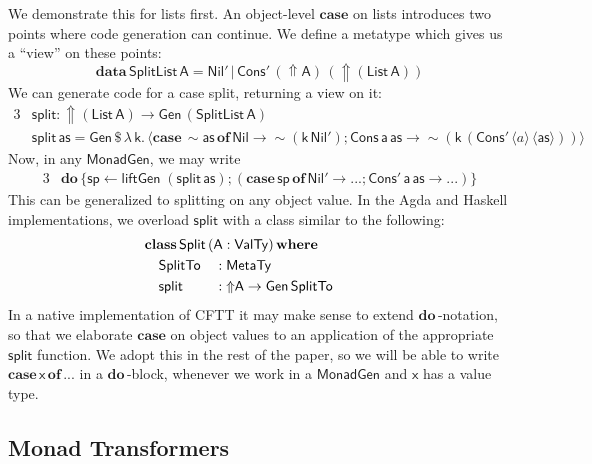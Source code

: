 \documentclass[acmsmall,screen,review,anonymous]{acmart}
\newcommand{\mit}[1]{{\mathsf{#1}}}
\newcommand{\msf}[1]{{\mathsf{#1}}}
\newcommand{\mbf}[1]{{\mathbf{#1}}}
\newcommand{\bs}[1]{\boldsymbol{#1}}
\newcommand{\mdo}{\mbf{do}\,}
\newcommand{\ind}{\hspace{1em}}
\newcommand{\lam}{\lambda\,}
\newcommand{\data}{\mbf{data}\,}
\newcommand{\where}{\mbf{where}}
\newcommand{\of}{\mbf{of}\,}
\newcommand{\vas}{\mathsf{as}}
\newcommand{\vk}{\mathsf{k}}
\newcommand{\vA}{\mathsf{A}}
\newcommand{\va}{\mathsf{a}}
\newcommand{\vx}{\mathsf{x}}
\newcommand{\List}{\msf{List}}
\newcommand{\Nil}{\msf{Nil}}
\newcommand{\Cons}{\msf{Cons}}
\newcommand{\fro}{\leftarrow}
\newcommand{\case}{\mbf{case\,}}
\newcommand{\Lift}{{\Uparrow}}
\newcommand{\Up}{{\Uparrow}}
\newcommand{\spl}{{\bs{\sim}}}
\newcommand{\ql}{{\bs{\langle}}}
\newcommand{\qr}{{\bs{\rangle}}}
\newcommand{\MTy}{\msf{MetaTy}}
\newcommand{\VTy}{\msf{ValTy}}
\theoremstyle{remark}
\newcommand{\tyclass}{\mbf{class}}
\newcommand{\Gen}{\msf{Gen}}
\newcommand{\qt}[1]{\ql#1\qr}
\newcommand{\liftGen}{\mit{liftGen}}
\newcommand{\MonadGen}{\msf{MonadGen}}
\newcommand{\dlr}{\,\$\,}
\begin{document}
We demonstrate this for lists first. An object-level $\mbf{case}$ on lists introduces
two points where code generation can continue. We define a metatype which gives
us a ``view'' on these points:
\[ \data \msf{SplitList}\,\vA = \Nil'\,|\,\Cons'\,(\Up \vA)\,(\Up (\List\,\vA)) \]
We can generate code for a case split, returning a view on it:
\begin{alignat*}{3}
  &\mit{split} : \Up (\List\,\vA) \to \Gen\,(\msf{SplitList}\,\vA)\\
  &\mit{split}\,\vas = \Gen \dlr \lam \vk.\,\qt{\case \spl \vas\,\of \Nil \to \spl(\vk\,\Nil'); \Cons\,\va\,\vas \to \spl(\vk\,(\Cons'\,\qt{a}\,\qt{\vas}))}
\end{alignat*}
Now, in any $\MonadGen$, we may write
\begin{alignat*}{3}
  &\mdo \{\mit{sp} \fro \liftGen\;(\!\mit{split}\,\vas);(\case \mit{sp}\,\of \Nil' \to ...;\Cons'\,\va\,\vas \to ...)\}
\end{alignat*}
This can be generalized to splitting on any object value. In the Agda and
Haskell implementations, we overload $\mit{split}$ with a class similar to the
following:
\begin{alignat*}{3}
  & \hspace{-2em}\mathrlap{\tyclass\,\mit{Split}\,(\vA : \VTy)\,\where}\\
  & \hspace{-2em}\ind \mit{SplitTo} &&: \MTy \\
  & \hspace{-2em}\ind \mit{split}   &&: \Lift \vA \to \Gen\,\mit{SplitTo}
\end{alignat*}
In a native implementation of CFTT it may make sense to extend $\mdo$-notation,
so that we elaborate $\mbf{case}$ on object values to an application of the
appropriate $\mit{split}$ function. We adopt this in the rest of the paper, so
we will be able to write $\case \vx\,\of ...$ in a $\mdo$-block, whenever we
work in a $\MonadGen$ and $\vx$ has a value type.

\subsection{Monad Transformers}\label{monad-transformers}
\end{document}
